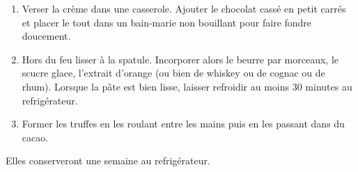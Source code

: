 
\begin{ingredients}
\end{ingredients}


\begin{recipe}
  \begin{enumerate}

  \item Verser la cr\`eme dans une casserole.  Ajouter le chocolat
    cass\'e en petit carr\'es et placer le tout dans un bain-marie non
    bouillant pour faire fondre doucement.

  \item Hors du feu lisser \`a la spatule.  Incorporer alors le beurre
    par morceaux, le scucre glace, l'extrait d'orange (ou bien de
    whiskey ou de cognac ou de rhum).  Lorsque la p\^ate est bien
    lisse, laisser refroidir au moins 30 minutes au refrig\'erateur.

  \item Former les truffes en les roulant entre les mains puis en les
    passant dans du cacao.

  \end{enumerate}

  Elles conserveront une semaine au refrig\'erateur.

\end{recipe}
